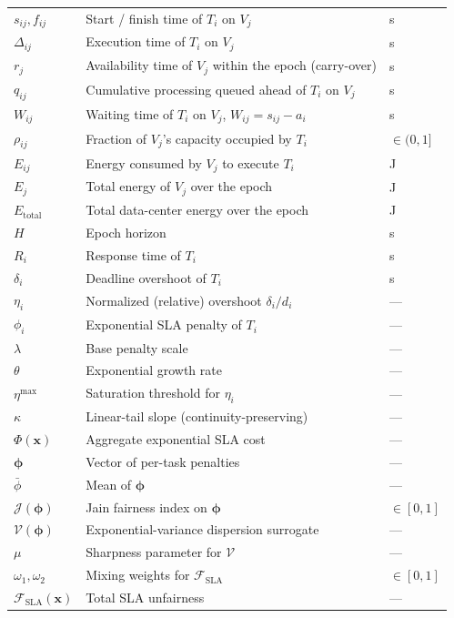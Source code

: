 \documentclass[11pt,a4paper]{article}
\begin{document}
\begin{longtable}{p{4.5cm} p{9.5cm} p{2.5cm}}
$s_{ij}, f_{ij}$ & Start / finish time of $T_i$ on $V_j$ & s \\
$\Delta_{ij}$ & Execution time of $T_i$ on $V_j$ & s \\
$r_j$ & Availability time of $V_j$ within the epoch (carry-over) & s \\
$q_{ij}$ & Cumulative processing queued ahead of $T_i$ on $V_j$ & s \\
$W_{ij}$ & Waiting time of $T_i$ on $V_j$, $W_{ij} = s_{ij} - a_i$ & s \\
$\rho_{ij}$ & Fraction of $V_j$'s capacity occupied by $T_i$ & $\in (0,1]$ \\
$E_{ij}$ & Energy consumed by $V_j$ to execute $T_i$ & J \\
$E_j$ & Total energy of $V_j$ over the epoch & J \\
$E_{\text{total}}$ & Total data-center energy over the epoch & J \\
$H$ & Epoch horizon & s \\
$R_i$ & Response time of $T_i$ & s \\
$\delta_i$ & Deadline overshoot of $T_i$ & s \\
$\eta_i$ & Normalized (relative) overshoot $\delta_i / d_i$ & --- \\
$\phi_i$ & Exponential SLA penalty of $T_i$ & --- \\
$\lambda$ & Base penalty scale & --- \\
$\theta$ & Exponential growth rate & --- \\
$\eta^{\max}$ & Saturation threshold for $\eta_i$ & --- \\
$\kappa$ & Linear-tail slope (continuity-preserving) & --- \\
$\Phi(\mathbf{x})$ & Aggregate exponential SLA cost & --- \\
$\boldsymbol{\phi}$ & Vector of per-task penalties & --- \\
$\bar{\phi}$ & Mean of $\boldsymbol{\phi}$ & --- \\
$\mathcal{J}(\boldsymbol{\phi})$ & Jain fairness index on $\boldsymbol{\phi}$ & $\in [0,1]$ \\
$\mathcal{V}(\boldsymbol{\phi})$ & Exponential-variance dispersion surrogate & --- \\
$\mu$ & Sharpness parameter for $\mathcal{V}$ & --- \\
$\omega_1, \omega_2$ & Mixing weights for $\mathcal{F}_{\text{SLA}}$ & $\in [0,1]$ \\
$\mathcal{F}_{\text{SLA}}(\mathbf{x})$ & Total SLA unfairness & --- \\

\end{longtable}
\end{document}
